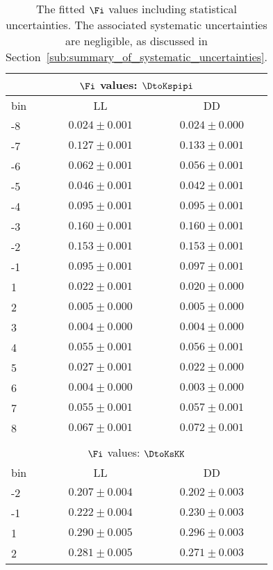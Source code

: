 \begin{table}
\centering

\caption{The fitted $\Fi$ values including statistical uncertainties. The associated systematic uncertainties are negligible, as discussed in Section~\ref{sub:summary_of_systematic_uncertainties}.
\label{tab:Fi_values}
}

\begin{tabular}{lcc}
\toprule
\multicolumn{3}{c}{$\Fi$ values: $\DtoKspipi$}\\
\midrule
bin &                 LL &                 DD \\
\midrule
-8  &  $0.024 \pm 0.001$ &  $0.024 \pm 0.000$ \\
-7  &  $0.127 \pm 0.001$ &  $0.133 \pm 0.001$ \\
-6  &  $0.062 \pm 0.001$ &  $0.056 \pm 0.001$ \\
-5  &  $0.046 \pm 0.001$ &  $0.042 \pm 0.001$ \\
-4  &  $0.095 \pm 0.001$ &  $0.095 \pm 0.001$ \\
-3  &  $0.160 \pm 0.001$ &  $0.160 \pm 0.001$ \\
-2  &  $0.153 \pm 0.001$ &  $0.153 \pm 0.001$ \\
-1  &  $0.095 \pm 0.001$ &  $0.097 \pm 0.001$ \\
 1  &  $0.022 \pm 0.001$ &  $0.020 \pm 0.000$ \\
 2  &  $0.005 \pm 0.000$ &  $0.005 \pm 0.000$ \\
 3  &  $0.004 \pm 0.000$ &  $0.004 \pm 0.000$ \\
 4  &  $0.055 \pm 0.001$ &  $0.056 \pm 0.001$ \\
 5  &  $0.027 \pm 0.001$ &  $0.022 \pm 0.000$ \\
 6  &  $0.004 \pm 0.000$ &  $0.003 \pm 0.000$ \\
 7  &  $0.055 \pm 0.001$ &  $0.057 \pm 0.001$ \\
 8  &  $0.067 \pm 0.001$ &  $0.072 \pm 0.001$ \\
\midrule \\

\multicolumn{3}{c}{$\Fi$ values: $\DtoKsKK$}\\

\midrule
bin &                 LL &                 DD \\
\midrule
-2  &  $0.207 \pm 0.004$ &  $0.202 \pm 0.003$ \\
-1  &  $0.222 \pm 0.004$ &  $0.230 \pm 0.003$ \\
 1  &  $0.290 \pm 0.005$ &  $0.296 \pm 0.003$ \\
 2  &  $0.281 \pm 0.005$ &  $0.271 \pm 0.003$ \\
\bottomrule
\end{tabular}
\end{table}
